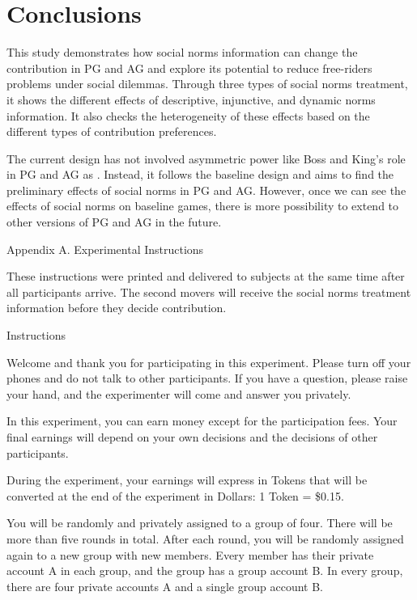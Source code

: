 \documentclass[12pt]{article}
\begin{document}
\section{Conclusions}

This study demonstrates how social norms information can change the contribution in PG and AG and explore its potential to reduce free-riders problems under social dilemmas. Through three types of social norms treatment, it shows the different effects of descriptive, injunctive, and dynamic norms information. It also checks the heterogeneity of these effects based on the different types of contribution preferences. 

The current design has not involved asymmetric power like Boss and King's role in PG and AG as \cite{cox2013provision}. Instead, it follows the baseline design and aims to find the preliminary effects of social norms in PG and AG. However, once we can see the effects of social norms on baseline games, there is more possibility to extend to other versions of PG and AG in the future. 

\newpage

Appendix A. Experimental Instructions

These instructions were printed and delivered to subjects at the same time after all participants arrive. The second movers will receive the social norms treatment information before they decide contribution.
 
Instructions

Welcome and thank you for participating in this experiment. Please turn off your phones and do not talk to other participants. If you have a question, please raise your hand, and the experimenter will come and answer you privately. 

In this experiment, you can earn money except for the participation fees. Your final earnings will depend on your own decisions and the decisions of other participants. 

During the experiment, your earnings will express in Tokens that will be converted at the end of the experiment in Dollars: 1 Token = \$0.15.

You will be randomly and privately assigned to a group of four. There will be more than five rounds in total. After each round, you will be randomly assigned again to a new group with new members. Every member has their private account A in each group, and the group has a group account B. In every group, there are four private accounts A and a single group account B. 
\end{document}
